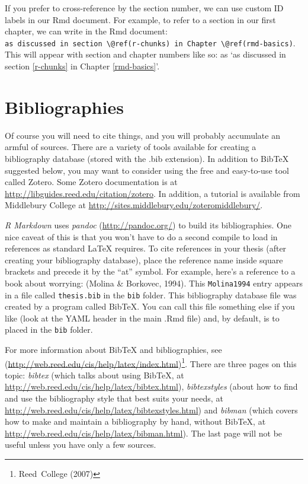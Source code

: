 \documentclass[print]{nuthesis}
\begin{document}
If you prefer to cross-reference by the section number, we can use custom ID labels in our Rmd document. For example, to refer to a section in our first chapter, we can write in the Rmd document: \texttt{as\ discussed\ in\ section\ \textbackslash{}@ref(r-chunks)\ in\ Chapter\ \textbackslash{}@ref(rmd-basics)}. This will appear with section and chapter numbers like so: as `as discussed in section \ref{r-chunks} in Chapter \ref{rmd-basics}'.

\hypertarget{bibliographies}{%
\section{Bibliographies}\label{bibliographies}}

Of course you will need to cite things, and you will probably accumulate an armful of sources. There are a variety of tools available for creating a bibliography database (stored with the .bib extension). In addition to BibTeX suggested below, you may want to consider using the free and easy-to-use tool called Zotero. Some Zotero documentation is at \url{http://libguides.reed.edu/citation/zotero}. In addition, a tutorial is available from Middlebury College at \url{http://sites.middlebury.edu/zoteromiddlebury/}.

\emph{R Markdown} uses \emph{pandoc} (\url{http://pandoc.org/}) to build its bibliographies. One nice caveat of this is that you won't have to do a second compile to load in references as standard LaTeX requires. To cite references in your thesis (after creating your bibliography database), place the reference name inside square brackets and precede it by the ``at'' symbol. For example, here's a reference to a book about worrying: (Molina \& Borkovec, 1994). This \texttt{Molina1994} entry appears in a file called \texttt{thesis.bib} in the \texttt{bib} folder. This bibliography database file was created by a program called BibTeX. You can call this file something else if you like (look at the YAML header in the main .Rmd file) and, by default, is to placed in the \texttt{bib} folder.

For more information about BibTeX and bibliographies, see (\url{http://web.reed.edu/cis/help/latex/index.html})\footnote{Reed~College (2007)}. There are three pages on this topic: \emph{bibtex} (which talks about using BibTeX, at \url{http://web.reed.edu/cis/help/latex/bibtex.html}), \emph{bibtexstyles} (about how to find and use the bibliography style that best suits your needs, at \url{http://web.reed.edu/cis/help/latex/bibtexstyles.html}) and \emph{bibman} (which covers how to make and maintain a bibliography by hand, without BibTeX, at \url{http://web.reed.edu/cis/help/latex/bibman.html}). The last page will not be useful unless you have only a few sources.
\end{document}
